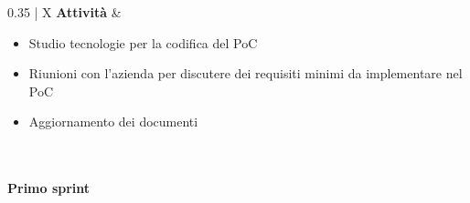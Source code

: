 \begin{xltabular}{\textwidth}{{0.35\textwidth} | X}
    \textbf{Attività} 
    & \begin{itemize}
        \item Studio tecnologie per la codifica del PoC 
        \item Riunioni con l'azienda per discutere dei requisiti minimi da implementare nel PoC
        \item Aggiornamento dei documenti
    \end{itemize} \\
    \hline

\caption{Tabella descrittiva del periodo 1 della fase di progettazione della Technology Baseline}\label{tab:periodo2_1}
\end{xltabular}

\newpage 

\paragraph{Primo sprint}\label{sec:pianificazione:codificaRTB:periodi:primo}

